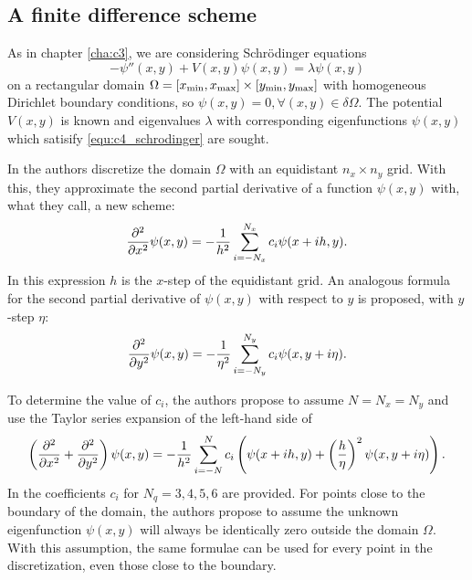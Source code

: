 \subsection{A finite difference scheme}

As in chapter \ref{cha:c3}, we are considering Schrödinger equations
\begin{equation}\label{equ:c4_schrodinger}
    -\psi''(x, y) + V(x, y) \psi(x, y) = \lambda \psi(x, y)
\end{equation}
on a rectangular domain $\Omega = [{x_{\text{min}}}, {x_{\text{max}}}] \times [{y_{\text{min}}}, {y_{\text{max}}}]$ with homogeneous Dirichlet boundary conditions, so $\psi(x, y) = 0, \forall (x, y) \in \delta \Omega$. The potential $V(x, y)$ is known and eigenvalues $\lambda$ with corresponding eigenfunctions $\psi(x, y)$ which satisify \eqref{equ:c4_schrodinger} are sought.

In \cite{wang_new_2009} the authors discretize the domain $\Omega$ with an equidistant $n_x \times n_y$ grid. With this, they approximate the second partial derivative of a function $\psi(x, y)$ with, what they call, a new scheme:
$$
    {\pdv[2]{}{x}}\psi(x, y) = -\frac{1}{h^2}\sum_{i=-N_x}^{N_x} c_i \psi(x + ih, y)\text{.}
$$
In this expression $h$ is the $x$-step of the equidistant grid. An analogous formula for the second partial derivative of $\psi(x, y)$ with respect to $y$ is proposed, with $y$-step $\eta$:
$$
    {\pdv[2]{}{y}}\psi(x, y) = -\frac{1}{\eta^2}\sum_{i=-N_y}^{N_y} c_i \psi(x, y + i\eta)\text{.}
$$

To determine the value of $c_i$, the authors propose to assume $N = N_x = N_y$ and use the Taylor series expansion of the left-hand side of
$$
    \left({\pdv[2]{}{x}} + {\pdv[2]{}{y}}\right)\psi(x, y) = -\frac{1}{h^2} \sum_{i=-N}^{N} c_i \left(\psi(x+ih, y) + \left(\frac{h}{\eta}\right)^2\psi(x, y+i\eta)\right)\text{.}
$$
In \cite{wang_new_2009} the coefficients $c_i$ for $N_q = 3, 4, 5, 6$ are provided. For points close to the boundary of the domain, the authors propose to assume the unknown eigenfunction $\psi(x, y)$ will always be identically zero outside the domain $\Omega$. With this assumption, the same formulae can be used for every point in the discretization, even those close to the boundary.

